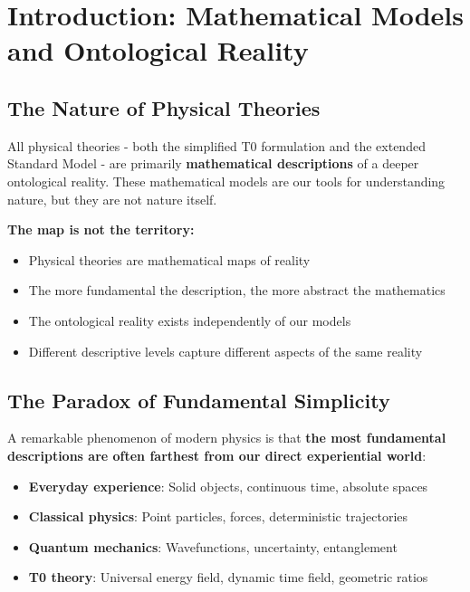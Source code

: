 \section{Introduction: Mathematical Models and Ontological Reality}

	
	\subsection{The Nature of Physical Theories}
	
	All physical theories - both the simplified T0 formulation and the extended Standard Model - are primarily \textbf{mathematical descriptions} of a deeper ontological reality. These mathematical models are our tools for understanding nature, but they are not nature itself.
	
	\begin{tcolorbox}[colback=gray!5!white,colframe=gray!75!black,title=Fundamental Epistemological Insight]
		\textbf{The map is not the territory:}
		\begin{itemize}
			\item Physical theories are mathematical maps of reality
			\item The more fundamental the description, the more abstract the mathematics
			\item The ontological reality exists independently of our models
			\item Different descriptive levels capture different aspects of the same reality
		\end{itemize}
	\end{tcolorbox}
	
	\subsection{The Paradox of Fundamental Simplicity}
	
	A remarkable phenomenon of modern physics is that \textbf{the most fundamental descriptions are often farthest from our direct experiential world}:
	
	\begin{itemize}
		\item \textbf{Everyday experience}: Solid objects, continuous time, absolute spaces
		\item \textbf{Classical physics}: Point particles, forces, deterministic trajectories
		\item \textbf{Quantum mechanics}: Wavefunctions, uncertainty, entanglement
		\item \textbf{T0 theory}: Universal energy field, dynamic time field, geometric ratios
	\end{itemize}
	
